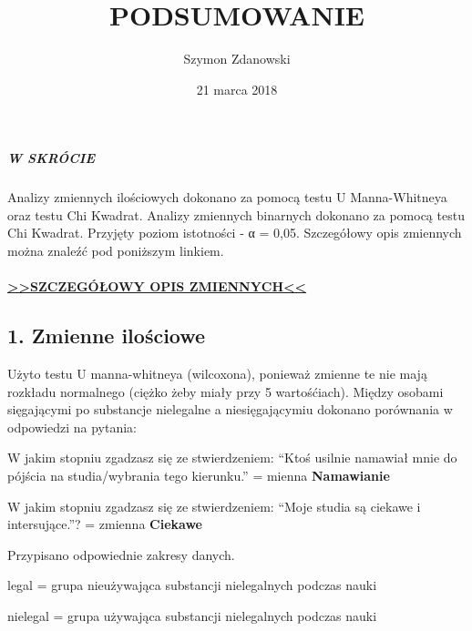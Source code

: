 \documentclass[]{article}
\title{PODSUMOWANIE}
\author{Szymon Zdanowski}
\date{21 marca 2018}
\newenvironment{Shaded}{\begin{snugshade}}{\end{snugshade}}
\newcommand{\KeywordTok}[1]{\textcolor[rgb]{0.13,0.29,0.53}{\textbf{#1}}}
\newcommand{\DataTypeTok}[1]{\textcolor[rgb]{0.13,0.29,0.53}{#1}}
\newcommand{\DecValTok}[1]{\textcolor[rgb]{0.00,0.00,0.81}{#1}}
\newcommand{\StringTok}[1]{\textcolor[rgb]{0.31,0.60,0.02}{#1}}
\newcommand{\CommentTok}[1]{\textcolor[rgb]{0.56,0.35,0.01}{\textit{#1}}}
\newcommand{\OperatorTok}[1]{\textcolor[rgb]{0.81,0.36,0.00}{\textbf{#1}}}
\newcommand{\NormalTok}[1]{#1}
\let\oldparagraph\paragraph
\renewcommand{\paragraph}[1]{\oldparagraph{#1}\mbox{}}
\let\oldsubparagraph\subparagraph
\renewcommand{\subparagraph}[1]{\oldsubparagraph{#1}\mbox{}}
\begin{document}
\maketitle

\subparagraph{W SKRÓCIE}\label{w-skrocie}

Analizy zmiennych ilościowych dokonano za pomocą testu U Manna-Whitneya
oraz testu Chi Kwadrat. Analizy zmiennych binarnych dokonano za pomocą
testu Chi Kwadrat. Przyjęty poziom istotności - α = 0,05. Szczegółowy
opis zmiennych można znaleźć pod poniższym linkiem.

\paragraph{\texorpdfstring{\href{http://htmlpreview.github.io/?https://github.com/zdanowski/Ankieta_substancje_psychoaktywne/blob/master/OPIS_ZMIENNYCH.html}{\textgreater{}\textgreater{}SZCZEGÓŁOWY
OPIS
ZMIENNYCH\textless{}\textless{}}}{\textgreater{}\textgreater{}SZCZEGÓŁOWY OPIS ZMIENNYCH\textless{}\textless{}}}\label{szczegoowy-opis-zmiennych}

\subsection{1. Zmienne ilościowe}\label{zmienne-ilosciowe}

Użyto testu U manna-whitneya (wilcoxona), ponieważ zmienne te nie mają
rozkładu normalnego (ciężko żeby miały przy 5 wartośćiach). Między
osobami sięgającymi po substancje nielegalne a niesięgającymiu dokonano
porównania w odpowiedzi na pytania:

W jakim stopniu zgadzasz się ze stwierdzeniem: ``Ktoś usilnie namawiał
mnie do pójścia na studia/wybrania tego kierunku.'' = mienna
\textbf{Namawianie}

W jakim stopniu zgadzasz się ze stwierdzeniem: ``Moje studia są ciekawe
i intersujące.''? = zmienna \textbf{Ciekawe}

Przypisano odpowiednie zakresy danych.

legal = grupa nieużywająca substancji nielegalnych podczas nauki

nielegal = grupa używająca substancji nielegalnych podczas nauki

\begin{Shaded}
\end{Shaded}
\end{document}
